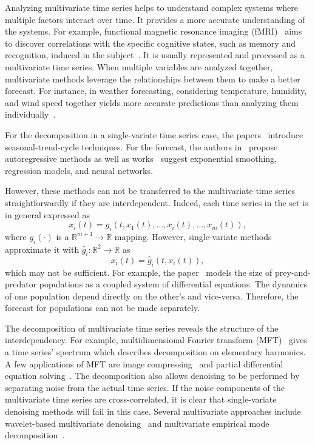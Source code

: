 \documentclass[referee, pdflatex, sn-mathphys-num]{sn-jnl}
\theoremstyle{definition}
\theoremstyle{plain}
\begin{document}
	Analyzing multivariate time series helps to understand complex systems where multiple factors interact over time. It provides a more accurate understanding of the systems.  For example, functional magnetic resonance imaging (fMRI)~{\cite{rinck2018magnetic}} aims to discover correlations with the specific cognitive states, such as memory and recognition, induced in the subject~{\cite{Logothetis2008WhatWC}}. It is usually represented and processed as a multivariate time series. When multiple variables are analyzed together, multivariate methods leverage the relationships between them to make a better forecast. For instance, in weather forecasting, considering temperature, humidity, and wind speed together yields more accurate predictions than analyzing them individually~{\cite{weather_forecast}}.
	
	For the decomposition in a single-variate time series case, the papers~\cite{enders2010applied, x11, cleveland90} introduce seasonal-trend-cycle techniques. For the forecast, the authors in~\cite{Box_Jenkins_methodology} propose autoregressive methods as well as works~\cite{3b1355aedd1041f1853e609a410576f3, enders2010applied} suggest exponential smoothing, regression models, and neural networks. 
	
	However, these methods can not be transferred to the multivariate time series straightforwardly if they are interdependent. Indeed, each time series in the set is in general expressed as \begin{equation*}
		x_i(t) = g_i(t, x_1(t), \ldots, x_i(t), \ldots, x_m(t)),
	\end{equation*}	where $g_i(\cdot)$ is a $\mathbb{R}^{m + 1} \to \mathbb{R}$ mapping. However, single-variate methods approximate it with $\hat{g}_i: \mathbb{R}^2 \to \mathbb{R}$ as \begin{equation*}
		x_i(t) = \hat{g}_i(t, x_i(t)),
	\end{equation*}	which may not be sufficient. For example, the paper~\cite{Volterra:1928} models the size of prey-and-predator populations as a coupled system of differential equations. The dynamics of one population depend directly on the other's and vice-versa. Therefore, the forecast for populations can not be made separately. 
	
	The decomposition of multivariate time series reveals the structure of the interdependency. For example, multidimensional Fourier transform (MFT)~{\cite{smith1995handbook}} gives a time series' spectrum which describes decomposition on elementary harmonics. A few applications of MFT are image compressing~{\cite{jpeg}} and partial differential equation solving~{\cite{haberman2013applied}}. The decomposition also allows denoising to be performed by separating noise from the actual time series. If the noise components of the multivariate time series are cross-correlated, it is clear that single-variate denoising methods will fail in this case. Several multivariate approaches include wavelet-based multivariate denoising~{\cite{wavelet_denoise}} and multivariate empirical mode decomposition~{\cite{HAO2017263}}.
	
\end{document}
